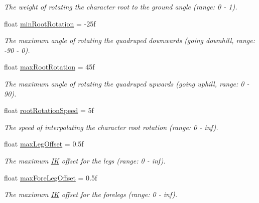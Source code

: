 \begin{DoxyCompactItemize}
\begin{DoxyCompactList}\small\item\em The weight of rotating the character root to the ground angle (range\+: 0 -\/ 1). \end{DoxyCompactList}\item 
float \mbox{\hyperlink{class_root_motion_1_1_final_i_k_1_1_grounder_quadruped_aa1f3caa665b0ef4c10f99cd3e99b5702}{min\+Root\+Rotation}} = -\/25f
\begin{DoxyCompactList}\small\item\em The maximum angle of rotating the quadruped downwards (going downhill, range\+: -\/90 -\/ 0). \end{DoxyCompactList}\item 
float \mbox{\hyperlink{class_root_motion_1_1_final_i_k_1_1_grounder_quadruped_a1ae3cb660578b39db1bb683aecdba964}{max\+Root\+Rotation}} = 45f
\begin{DoxyCompactList}\small\item\em The maximum angle of rotating the quadruped upwards (going uphill, range\+: 0 -\/ 90). \end{DoxyCompactList}\item 
float \mbox{\hyperlink{class_root_motion_1_1_final_i_k_1_1_grounder_quadruped_a736b656b2b63c9b287b3c1f186fa667e}{root\+Rotation\+Speed}} = 5f
\begin{DoxyCompactList}\small\item\em The speed of interpolating the character root rotation (range\+: 0 -\/ inf). \end{DoxyCompactList}\item 
float \mbox{\hyperlink{class_root_motion_1_1_final_i_k_1_1_grounder_quadruped_afe10dd0488a49bb92114bccf069d3892}{max\+Leg\+Offset}} = 0.\+5f
\begin{DoxyCompactList}\small\item\em The maximum \mbox{\hyperlink{class_root_motion_1_1_final_i_k_1_1_i_k}{IK}} offset for the legs (range\+: 0 -\/ inf). \end{DoxyCompactList}\item 
float \mbox{\hyperlink{class_root_motion_1_1_final_i_k_1_1_grounder_quadruped_a643c89f74432b0f52025b66e7c167787}{max\+Fore\+Leg\+Offset}} = 0.\+5f
\begin{DoxyCompactList}\small\item\em The maximum \mbox{\hyperlink{class_root_motion_1_1_final_i_k_1_1_i_k}{IK}} offset for the forelegs (range\+: 0 -\/ inf). \end{DoxyCompactList}\item 

\end{DoxyCompactItemize}
